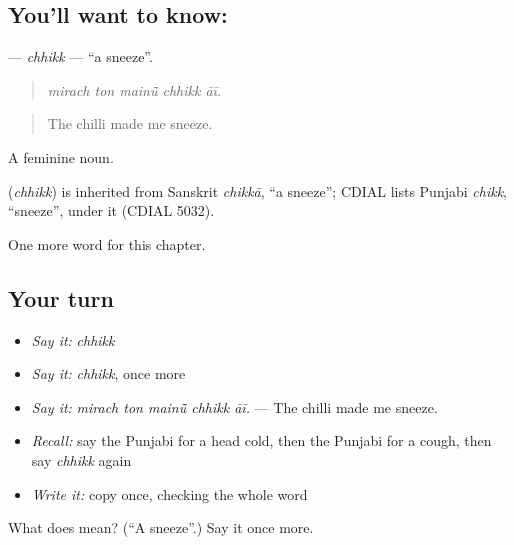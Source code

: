 \subsection*{You'll want to know: }
\textbf{} — \emph{chhikk} — \textquotedblleft{}a sneeze\textquotedblright{}.

\begin{quote}
    
\end{quote}

\begin{quote}
\emph{mirach ton mainū̃ chhikk āī.}
\end{quote}

\begin{quote}
The chilli made me sneeze.
\end{quote}

A feminine noun.

\begin{cousinweb}
\textbf{} (\emph{chhikk}) is inherited from Sanskrit \emph{chikkā}, \textquotedblleft{}a sneeze\textquotedblright{}; CDIAL lists Punjabi \emph{chikk}, \textquotedblleft{}sneeze\textquotedblright{}, under it (CDIAL 5032).
\end{cousinweb}

\begin{grammarlens}[title={What you've built}]
One more word for this chapter.
\end{grammarlens}

\subsection*{Your turn}
\begin{itemize}
\raggedright
  \item \emph{Say it:} \emph{chhikk}
  \item \emph{Say it:} \emph{chhikk}, once more
  \item \emph{Say it:} \emph{mirach ton mainū̃ chhikk āī.} — The chilli made me sneeze.
  \item \emph{Recall:} say the Punjabi for a head cold, then the Punjabi for a cough, then say \emph{chhikk} again
  \item \emph{Write it:} copy \textbf{} once, checking the whole word
\end{itemize}

\begin{tcolorbox}[breakable,colback=teal!4,colframe=teal!35!black,title={Before you move on}]
What does  mean? (\textquotedblleft{}A sneeze\textquotedblright{}.) Say it once more.
\end{tcolorbox}
